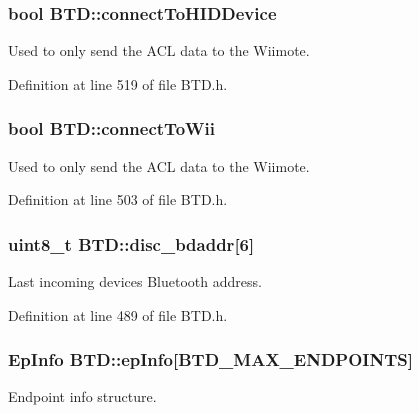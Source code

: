 \hypertarget{class_b_t_d_af40b8d52df99192880c8a13443b6c6d8}{
\subsubsection[{connect\-To\-H\-I\-D\-Device}]{\setlength{\rightskip}{0pt plus 5cm}bool {\bf \-B\-T\-D\-::connect\-To\-H\-I\-D\-Device}}}\label{class_b_t_d_af40b8d52df99192880c8a13443b6c6d8}
\-Used to only send the \-A\-C\-L data to the \-Wiimote. 

\-Definition at line 519 of file \-B\-T\-D.\-h.

\hypertarget{class_b_t_d_ac7caac80fb6f5f0e794af3644887d88e}{
\subsubsection[{connect\-To\-Wii}]{\setlength{\rightskip}{0pt plus 5cm}bool {\bf \-B\-T\-D\-::connect\-To\-Wii}}}\label{class_b_t_d_ac7caac80fb6f5f0e794af3644887d88e}
\-Used to only send the \-A\-C\-L data to the \-Wiimote. 

\-Definition at line 503 of file \-B\-T\-D.\-h.

\hypertarget{class_b_t_d_ab23f95f12675d7b4505ca6807d379182}{
\subsubsection[{disc\-\_\-bdaddr}]{\setlength{\rightskip}{0pt plus 5cm}uint8\-\_\-t {\bf \-B\-T\-D\-::disc\-\_\-bdaddr}\mbox{[}6\mbox{]}}}\label{class_b_t_d_ab23f95f12675d7b4505ca6807d379182}
\-Last incoming devices \-Bluetooth address. 

\-Definition at line 489 of file \-B\-T\-D.\-h.

\hypertarget{class_b_t_d_a91d92fee94e5a4cbca472bb3fd883e3e}{
\subsubsection[{ep\-Info}]{\setlength{\rightskip}{0pt plus 5cm}\-Ep\-Info {\bf \-B\-T\-D\-::ep\-Info}\mbox{[}{\bf \-B\-T\-D\-\_\-\-M\-A\-X\-\_\-\-E\-N\-D\-P\-O\-I\-N\-T\-S}\mbox{]}}}\label{class_b_t_d_a91d92fee94e5a4cbca472bb3fd883e3e}
\-Endpoint info structure. 

